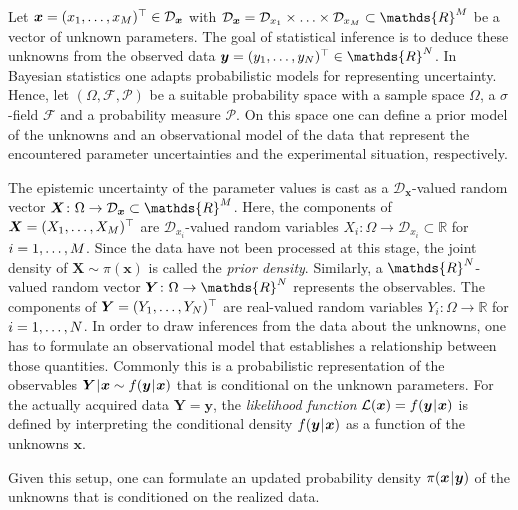 Let \(\bm{x} = (x_1,\ldots,x_M)^\top \in \mathcal{D}_{\bm{x}}\)
with \(\mathcal{D}_{\bm{x}} = \mathcal{D}_{x_1} \times \ldots \times \mathcal{D}_{x_\dimParam} \subset \mathds{R}^\dimParam\) be a vector of unknown parameters.
The goal of statistical inference is to deduce these unknowns from the observed data \(\bm{y} = (y_1,\ldots,y_\dimData)^\top \in \mathds{R}^\dimData\).
In Bayesian statistics one adapts probabilistic models for representing uncertainty.
Hence, let \((\Omega,\mathcal{F},\mathcal{P})\) be a suitable probability space with a sample space \(\Omega\), a \(\sigma\)-field \(\mathcal{F}\) and a probability measure \(\mathcal{P}\).
On this space one can define a prior model of the unknowns and an observational model of the data
that represent the encountered parameter uncertainties and the experimental situation, respectively.
\par %
The epistemic uncertainty of the parameter values is cast as a \(\mathcal{D}_{\bm{x}}\)-valued random vector \(\bm{X} \colon \Omega \rightarrow \mathcal{D}_{\bm{x}} \subset \mathds{R}^\dimParam\).
Here, the components of \(\bm{X} = (X_1,\ldots,X_M)^\top\) are \(\mathcal{D}_{x_i}\)-valued random variables
\(X_i \colon \Omega \rightarrow \mathcal{D}_{x_i} \subset \mathds{R}\) for \(i = 1,\ldots,M\).
Since the data have not been processed at this stage, the joint density of \(\bm{X} \sim \pi(\bm{x})\) is called the \emph{prior density}.
Similarly, a \(\mathds{R}^\dimData\)-valued random vector \(\bm{Y} \colon \Omega \rightarrow \mathds{R}^\dimData\) represents the observables.
The components of \(\bm{Y} = (Y_1,\ldots,Y_N)^\top\) are real-valued random variables \(Y_i \colon \Omega \rightarrow \mathds{R}\) for \(i = 1,\ldots,N\).
In order to draw inferences from the data about the unknowns, one has to formulate an observational model that establishes a relationship between those quantities.
Commonly this is a probabilistic representation of the observables \(\bm{Y} {\:\!}|{\:\!} \bm{x} \sim f(\bm{y} {\:\!}|{\:\!} \bm{x})\) that is conditional on the unknown parameters.
For the actually acquired data \(\bm{Y} = \bm{y}\), the \emph{likelihood function} \(\mathcal{L}(\bm{x}) = f(\bm{y} {\:\!}|{\:\!} \bm{x})\)
is defined by interpreting the conditional density \(f(\bm{y} {\:\!}|{\:\!} \bm{x})\) as a function of the unknowns \(\bm{x}\).
\par %
Given this setup, one can formulate an updated probability density \(\pi(\bm{x} {\:\!}|{\:\!} \bm{y})\) of the unknowns that is conditioned on the realized data.
